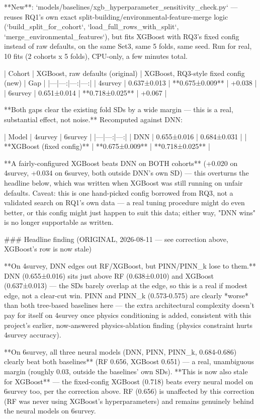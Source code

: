 **New**: `models/baselines/xgb_hyperparameter_sensitivity_check.py` — reuses RQ1's own exact
split-building/environmental-feature-merge logic (`build_split_for_cohort`,
`load_full_rows_with_split`, `merge_environmental_features`), but fits XGBoost with RQ3's fixed
config instead of raw defaults, on the same Set3, same 5 folds, same seed. Run for real, 10 fits
(2 cohorts x 5 folds), CPU-only, a few minutes total.

| Cohort | XGBoost, raw defaults (original) | XGBoost, RQ3-style fixed config (new) | Gap |
|---|---:|---:|---:|
| 4survey | 0.637±0.013 | **0.675±0.009** | +0.038 |
| 6survey | 0.651±0.014 | **0.718±0.025** | +0.067 |

**Both gaps clear the existing fold SDs by a wide margin — this is a real, substantial effect, not
noise.** Recomputed against DNN:

| Model | 4survey | 6survey |
|---|---:|---:|
| DNN | 0.655±0.016 | 0.684±0.031 |
| **XGBoost (fixed config)** | **0.675±0.009** | **0.718±0.025** |

**A fairly-configured XGBoost beats DNN on BOTH cohorts** (+0.020 on 4survey, +0.034 on 6survey,
both outside DNN's own SD) — this overturns the headline below, which was written when XGBoost was
still running on unfair defaults. Caveat: this is one hand-picked config borrowed from RQ3, not a
validated search on RQ1's own data — a real tuning procedure might do even better, or this config
might just happen to suit this data; either way, "DNN wins" is no longer supportable as written.

### Headline finding (ORIGINAL, 2026-08-11 — see correction above, XGBoost's row is now stale)

**On 4survey, DNN edges out RF/XGBoost, but PINN/PINN_k lose to them.** DNN (0.655±0.016) sits
just above RF (0.638±0.010) and XGBoost (0.637±0.013) — the SDs barely overlap at the edge, so
this is a real if modest edge, not a clear-cut win. PINN and PINN_k (0.573-0.575) are clearly
*worse* than both tree-based baselines here — the extra architectural complexity doesn't pay for
itself on 4survey once physics conditioning is added, consistent with this project's earlier,
now-answered physics-ablation finding (physics constraint hurts 4survey accuracy).

**On 6survey, all three neural models (DNN, PINN, PINN_k, 0.684-0.686) clearly beat both
baselines** (RF 0.656, XGBoost 0.651) — a real, unambiguous margin (roughly 0.03, outside the
baselines' own SDs). **This is now also stale for XGBoost** — the fixed-config XGBoost (0.718)
beats every neural model on 6survey too, per the correction above. RF (0.656) is unaffected by
this correction (RF was never using XGBoost's hyperparameters) and remains genuinely behind the
neural models on 6survey.

